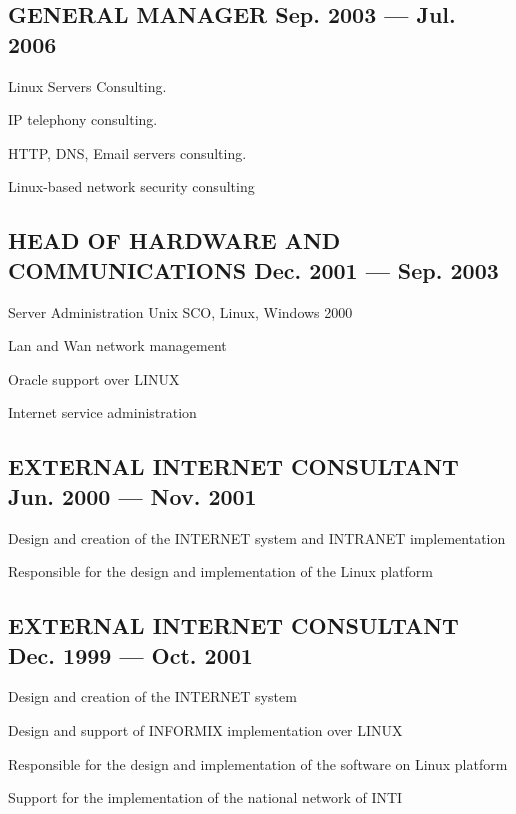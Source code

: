 \documentclass[letter,10pt]{article}
\begin{document}
\subsection{{GENERAL MANAGER \hfill Sep. 2003 --- Jul. 2006}}
\begin{zitemize}
\item	Linux Servers Consulting.
\item	IP telephony consulting.
\item	HTTP, DNS, Email servers consulting.
\item	Linux-based network security consulting	
\end{zitemize}
\vspace*{2mm}
\subsection{{HEAD OF HARDWARE AND COMMUNICATIONS \hfill Dec. 2001 --- Sep. 2003}}
\begin{zitemize}
\item	Server Administration Unix SCO, Linux, Windows 2000
\item	Lan and Wan network management
\item	Oracle support over LINUX
\item	Internet service administration	
\end{zitemize}
\vspace*{2mm}
\subsection{{EXTERNAL INTERNET CONSULTANT \hfill Jun. 2000 --- Nov. 2001}}
\begin{zitemize}
\item	Design and creation of the INTERNET system and INTRANET implementation
\item	Responsible for the design and implementation of the Linux platform	
\end{zitemize}
\vspace*{2mm}
\subsection{{EXTERNAL INTERNET CONSULTANT \hfill Dec. 1999 --- Oct. 2001}}
\begin{zitemize}
\item		Design and creation of the INTERNET system
\item		Design and support of INFORMIX implementation over LINUX
\item		Responsible for the design and implementation of the software on Linux platform
\item		Support for the implementation of the national network of INTI
\end{zitemize}
\vspace*{2mm}
\end{document}
